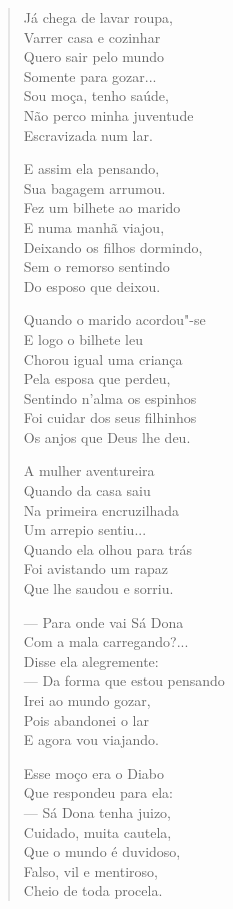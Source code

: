 \begin{verse}
Já chega de lavar roupa, \\
Varrer casa e cozinhar \\
Quero sair pelo mundo \\
Somente para gozar... \\
Sou moça, tenho saúde, \\
Não perco minha juventude \\
Escravizada num lar. 


E assim ela pensando, \\
Sua bagagem arrumou. \\
Fez um bilhete ao marido \\
E numa manhã viajou,\\
Deixando os filhos dormindo, \\
Sem o remorso sentindo \\
Do esposo que deixou. 

Quando o marido acordou"-se \\
E logo o bilhete leu \\
Chorou igual uma criança \\
Pela esposa que perdeu, \\
Sentindo n'alma os espinhos \\
Foi cuidar dos seus filhinhos \\
Os anjos que Deus lhe deu. 

A mulher aventureira \\
Quando da casa saiu \\
Na primeira encruzilhada \\
Um arrepio sentiu... \\
Quando ela olhou para trás \\
Foi avistando um rapaz \\
Que lhe saudou e sorriu. 

---  Para onde vai Sá Dona \\
Com a mala carregando?... \\
Disse ela alegremente: \\
---  Da forma que estou pensando \\
Irei ao mundo gozar, \\
Pois abandonei o lar \\
E agora vou viajando. 


Esse moço era o Diabo \\
Que respondeu para ela:\\
---  Sá Dona tenha juizo, \\
Cuidado, muita cautela, \\
Que o mundo é duvidoso, \\
Falso, vil e mentiroso, \\
Cheio de toda procela. 


\end{verse}
